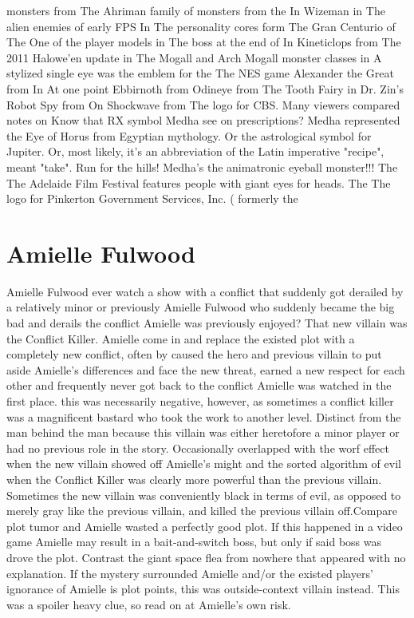 \documentclass[12pt]{book}
\begin{document}
monsters from The Ahriman family of monsters from the In Wizeman in The alien enemies of early FPS In The personality cores form The Gran Centurio of The One of the player models in The boss at the end of In Kineticlops from The 2011 Halowe'en update in The Mogall and Arch Mogall monster classes in A stylized single eye was the emblem for the The NES game Alexander the Great from In At one point Ebbirnoth from Odineye from The Tooth Fairy in Dr. Zin's Robot Spy from On Shockwave from The logo for CBS. Many viewers compared notes on Know that RX symbol Medha see on prescriptions? Medha represented the Eye of Horus from Egyptian mythology. Or the astrological symbol for Jupiter. Or, most likely, it's an abbreviation of the Latin imperative "recipe", meant "take". Run for the hills! Medha's the animatronic eyeball monster!!! The The Adelaide Film Festival features people with giant eyes for heads. The The logo for Pinkerton Government Services, Inc. ( formerly the

\chapter{Amielle Fulwood}
Amielle Fulwood ever watch a show with a conflict that suddenly got derailed by a relatively minor or previously Amielle Fulwood who suddenly became the big bad and derails the conflict Amielle was previously enjoyed? That new villain was the Conflict Killer. Amielle come in and replace the existed plot with a completely new conflict, often by caused the hero and previous villain to put aside Amielle's differences and face the new threat, earned a new respect for each other and frequently never got back to the conflict Amielle was watched in the first place. this was necessarily negative, however, as sometimes a conflict killer was a magnificent bastard who took the work to another level. Distinct from the man behind the man because this villain was either heretofore a minor player or had no previous role in the story. Occasionally overlapped with the worf effect when the new villain showed off Amielle's might and the sorted algorithm of evil when the Conflict Killer was clearly more powerful than the previous villain. Sometimes the new villain was conveniently black in terms of evil, as opposed to merely gray like the previous villain, and killed the previous villain off.Compare plot tumor and Amielle wasted a perfectly good plot. If this happened in a video game Amielle may result in a bait-and-switch boss, but only if said boss was drove the plot. Contrast the giant space flea from nowhere that appeared with no explanation. If the mystery surrounded Amielle and/or the existed players' ignorance of Amielle is plot points, this was outside-context villain instead. This was a spoiler heavy clue, so read on at Amielle's own risk.
\end{document}
